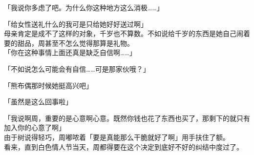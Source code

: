 「我说你多虑了吧。为什么你这种地方这么消极……」

「给女性送礼什么的我可是只给她好好送过啊」\\

母亲肯定是成不了这样的对象，千岁也不算数。不如说给千岁的东西是她自己闹着要的甜品，周甚至不怎么觉得那算是礼物。\\

「你在这种事情上面还真是缺乏自信啊……」

「不如说怎么可能会有自信……可是那家伙哦？」

「熊布偶那时候她挺高兴吧」

「虽然是这么回事啦」

「我说啊周，重要的是心意啊心意。既然你钱也花了东西也买了，那剩下的就只有加入你的心意了啊」\\

由于树说得轻巧，周嘟哝着「要是真能那么干脆就好了啊」用手扶住了额。\\

看来，直到白色情人节当天，周都得要在这个决定到底好不好的纠结中度过了。
